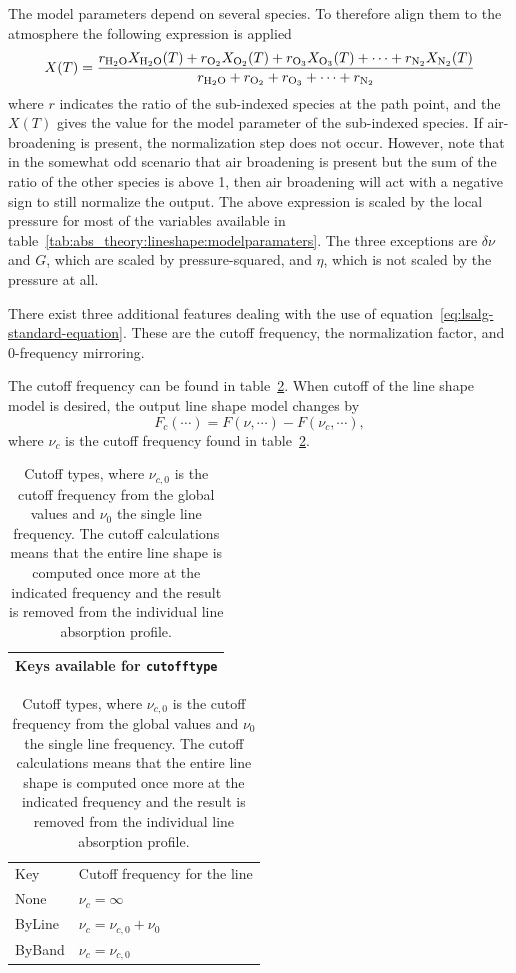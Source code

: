 The model parameters depend on several species.
To therefore align them to the atmosphere the following expression is applied
\begin{equation}
X(T) = \frac{r_{\rm{H}_2\rm{O}}X_{\rm{H}_2\rm{O}}(T) + r_{\rm{O}_2}X_{\rm{O}_2}(T) + r_{\rm{O}_3}X_{\rm{O}_3}(T) + \cdots + r_{\rm{N}_2}X_{\rm{N}_2}(T)}
{r_{\rm{H}_2\rm{O}}+r_{\rm{O}_2}+r_{\rm{O}_3}+\cdots+r_{\rm{N}_2}}
\end{equation}
where $r$ indicates the ratio of the sub-indexed species at the path point, and the 
$X(T)$ gives the value for the model parameter of the sub-indexed species. If air-broadening
is present, the normalization step does not occur.  However, note that 
in the somewhat odd scenario that air broadening is present but the sum
of the ratio of the other species is above 1, then air broadening will
act with a negative sign to still normalize the output.
The above expression is scaled by the local pressure for most of the variables available in 
table~\ref{tab:abs_theory:lineshape:modelparamaters}.  The three exceptions are $\delta\nu$ and 
$G$, which are scaled by pressure-squared, and $\eta$, which is not scaled by the pressure at all.

There exist three additional features dealing with the use of equation~\ref{eq:lsalg-standard-equation}.
These are the cutoff frequency, the normalization factor, and 0-frequency mirroring.

The cutoff frequency can be found
in table~\ref{tab:abs_theory:lineshape:cutofftype}.  When cutoff of the line shape model is desired,
the output line shape model changes by
\begin{equation}
 F_c(\cdots) = F(\nu, \cdots) - F(\nu_c, \cdots),
\end{equation}
where $\nu_c$ is the cutoff frequency found in table~\ref{tab:abs_theory:lineshape:cutofftype}.

\begin{table}[ht!]
 \centering
 \begin{tabular}{c}
  Keys available for \verb|cutofftype|\\\hline
 \end{tabular}
 
 \begin{tabular}{ll}
  Key&Cutoff frequency for the line\\
  None&$\nu_c = \infty$\\
  ByLine&$\nu_c = \nu_{c,0}+\nu_0$\\
  ByBand&$\nu_c = \nu_{c,0}$
 \end{tabular}
 \caption{Cutoff types, where $\nu_{c,0}$ is the cutoff frequency from the global values
 and $\nu_0$ the single line frequency.  The cutoff calculations means that the entire
 line shape is computed once more at the indicated frequency and the result is removed
 from the individual line absorption profile.}
 \label{tab:abs_theory:lineshape:cutofftype}
\end{table}

